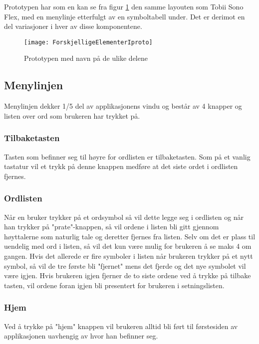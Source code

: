 Prototypen har som en kan se fra figur \ref{fig:protooo} den samme layouten som Tobii Sono Flex, med en menylinje etterfulgt av en symboltabell under. Det er derimot en del variasjoner i hver av disse komponentene.  

\begin{figure}[ht!] 
\centering 
\texttt{[image: ForskjelligeElementerIproto]} 
\caption{Prototypen med navn på de ulike delene} 
\label{fig:protooo} 
\end{figure} 


\subsection{Menylinjen} 
 
Menylinjen dekker 1/5 del av applikasjonens vindu og består av 4 knapper og listen over ord som brukeren har trykket på. 
 
\subsubsection{Tilbaketasten} 
 
Tasten som befinner seg til høyre for ordlisten er tilbaketasten. Som på et vanlig tastatur vil et trykk på denne knappen medføre at det siste ordet i ordlisten fjernes. 
 
\subsubsection{Ordlisten} 
 
Når en bruker trykker på et ordsymbol så vil dette legge seg i ordlisten og når han trykker på "prate"-knappen, så vil ordene i listen bli gitt gjennom høyttalerne som naturlig tale og deretter fjernes fra listen. Selv om det er plass til uendelig med ord i listen, så vil det kun være mulig for brukeren å se maks 4 om gangen. Hvis det allerede er fire symboler i listen når brukeren trykker på et nytt symbol, så vil de tre første bli "fjernet" mens det fjerde og det nye symbolet vil være igjen. Hvis brukeren igjen fjerner de to siste ordene ved å trykke på tilbake tasten,  vil ordene foran igjen bli presentert for brukeren i setningslisten.  
 
 
\subsubsection{Hjem} 
Ved å trykke på "hjem" knappen vil brukeren alltid bli ført til førstesiden av applikasjonen uavhengig av hvor han befinner seg.  
 
